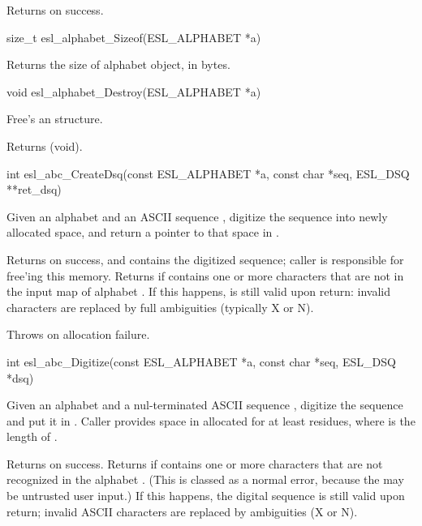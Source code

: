 \begin{sreapi}
Returns  on success.


\hypertarget{func:esl_alphabet_Sizeof()}
{\item[size\_t esl\_alphabet\_Sizeof(ESL\_ALPHABET *a)]}

Returns the size of alphabet  object, in bytes.


\hypertarget{func:esl_alphabet_Destroy()}
{\item[void esl\_alphabet\_Destroy(ESL\_ALPHABET *a)]}

Free's an  structure.

Returns (void).


\hypertarget{func:esl_abc_CreateDsq()}
{\item[int esl\_abc\_CreateDsq(const ESL\_ALPHABET *a, const char *seq, ESL\_DSQ **ret\_dsq)]}

Given an alphabet  and an ASCII sequence ,
digitize the sequence into newly allocated space, and 
return a pointer to that space in .

Returns  on success, and  contains the digitized
sequence; caller is responsible for free'ing this
memory. Returns  if  contains
one or more characters that are not in the input map of
alphabet . If this happens,  is still valid upon
return: invalid characters are replaced by full ambiguities
(typically X or N).

Throws  on allocation failure.



\hypertarget{func:esl_abc_Digitize()}
{\item[int esl\_abc\_Digitize(const ESL\_ALPHABET *a, const char *seq, ESL\_DSQ *dsq)]}

Given an alphabet  and a nul-terminated ASCII sequence
, digitize the sequence and put it in . Caller
provides space in  allocated for at least 
 residues, where  is the length of .

Returns  on success.
Returns  if  contains one or more characters
that are not recognized in the alphabet . (This is classed
as a normal error, because the  may be untrusted user input.)
If this happens, the digital sequence  is still valid upon
return; invalid ASCII characters are replaced by ambiguities
(X or N).



\end{sreapi}
